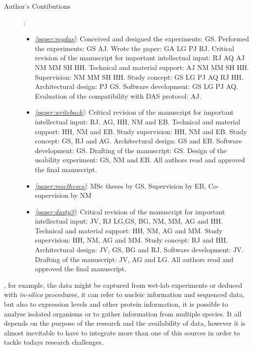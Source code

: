 \begin{description}
	\item[Author's Contibutions]:\\
		\begin{itemize}
			\item \emph{\ref{paper:mydas}}: Conceived and designed the experiments: GS. Performed the experiments: GS AJ. Wrote the paper: GA LG PJ RJ. Critical revision of the manuscript for important intellectual input: RJ AQ AJ NM MM SH HH. Technical and material support: AJ NM MM SH HH. Supervision: NM MM SH HH. Study concept: GS LG PJ AQ RJ HH. Architectural design: PJ GS. Software development: GS LG PJ AQ. Evaluation of the compatibility with DAS protocol: AJ.
			\item \emph{\ref{paper:writeback}}: Critical revision of the manuscript for important intellectual input: RJ, AG, HH, NM and EB. Technical and material support: HH, NM and EB. Study supervision: HH, NM and EB. Study concept: GS, RJ and AG. Architectural design: GS and EB. Software development: GS. Drafting of the manuscript: GS. Design of the usability experiment: GS, NM and EB. All authors read and approved the final manuscript.
			\item \emph{\ref{paper:msctheses}}: MSc theses by GS, Supervision by EB, Co-supervision by NM
			\item \emph{\ref{paper:dasty3}}: Critical revision of the manuscript for important intellectual input: JV, RJ LG,GS, BG, NM, MM, AG and HH. Technical and material support: HH, NM, AG and MM. Study supervision: HH, NM, AG and MM. Study concept:  RJ and HH. Architectural design: JV, GS, BG and RJ. Software development: JV. Drafting of the manuscript: JV, AG and LG. All authors read and approved the final manuscript.
		\end{itemize}
\end{description}
\newpage


, for example, the data might be captured from wet-lab experiments or deduced with \emph{in-silico} procedures, it can refer to nucleic information and sequenced data, but also to expression levels and other protein information, it is possible to analyse isolated organisms or to gather information from multiple species. It all depends on the purpose of the research and the availability of data, however it is almost inevitable to have to integrate more than one of this sources in order to tackle todays research challenges.

